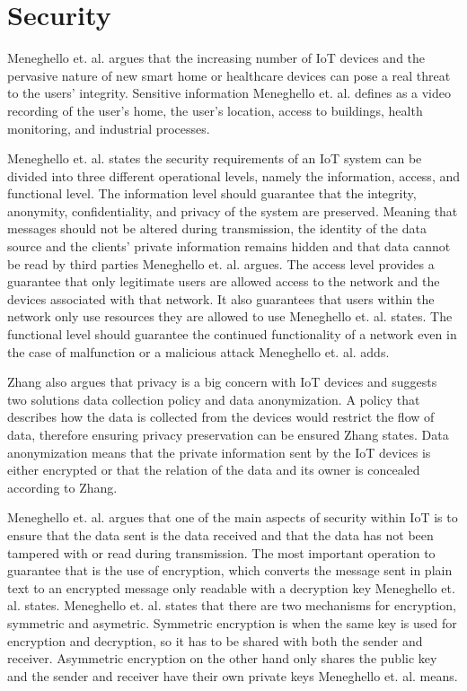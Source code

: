 \section{Security}
Meneghello et. al. argues that the increasing number of IoT devices and the pervasive nature of new smart home or healthcare devices can pose a real threat to the users' integrity.
Sensitive information Meneghello et. al. defines as a video recording of the user's home, the user's location, access to buildings, health monitoring, and industrial processes.\cite{Meneghello2019}

Meneghello et. al. states the security requirements of an IoT system can be divided into three different operational levels, namely the information, access, and functional level.
The information level should guarantee that the integrity, anonymity, confidentiality, and privacy of the system are preserved. 
Meaning that messages should not be altered during transmission, the identity of the data source and the clients' private information remains hidden and that data cannot be read by third parties Meneghello et. al. argues.
The access level provides a guarantee that only legitimate users are allowed access to the network and the devices associated with that network. 
It also guarantees that users within the network only use resources they are allowed to use Meneghello et. al. states.
The functional level should guarantee the continued functionality of a network even in the case of malfunction or a malicious attack Meneghello et. al. adds.\cite{Meneghello2019}

Zhang also argues that privacy is a big concern with IoT devices and suggests two solutions data collection policy and data anonymization.
A policy that describes how the data is collected from the devices would restrict the flow of data, therefore ensuring privacy preservation can be ensured Zhang states.
Data anonymization means that the private information sent by the IoT devices is either encrypted or that the relation of the data and its owner is concealed according to Zhang.\cite{Zhang2014}

Meneghello et. al. argues that one of the main aspects of security within IoT is to ensure that the data sent is the data received and that the data has not been tampered with or read during transmission.
The most important operation to guarantee that is the use of encryption, which converts the message sent in plain text to an encrypted message only readable with a decryption key Meneghello et. al. states.
Meneghello et. al. states that there are two mechanisms for encryption, symmetric and asymetric.
Symmetric encryption is when the same key is used for encryption and decryption, so it has to be shared with both the sender and receiver.
Asymmetric encryption on the other hand only shares the public key and the sender and receiver have their own private keys Meneghello et. al. means.\cite{Meneghello2019}

